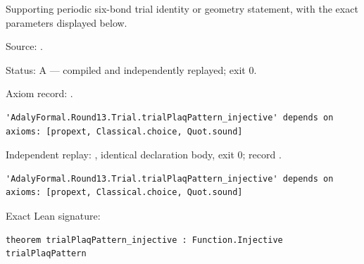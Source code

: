 \begin{theorem}[bp-383]
\label{bp-383}
\leanok
Supporting periodic six-bond trial identity or geometry statement, with the exact parameters displayed below.

\par Source: \texttt{}.
\par Status: A — compiled and independently replayed; exit 0.
\par Axiom record: \texttt{}.
\begin{verbatim}
'AdalyFormal.Round13.Trial.trialPlaqPattern_injective' depends on axioms: [propext, Classical.choice, Quot.sound]
\end{verbatim}
\par Independent replay: \texttt{}, identical declaration body, exit 0; record \texttt{}.
\begin{verbatim}
'AdalyFormal.Round13.Trial.trialPlaqPattern_injective' depends on axioms: [propext, Classical.choice, Quot.sound]
\end{verbatim}
\par Exact Lean signature:
\begin{verbatim}
theorem trialPlaqPattern_injective : Function.Injective trialPlaqPattern
\end{verbatim}
\end{theorem}

